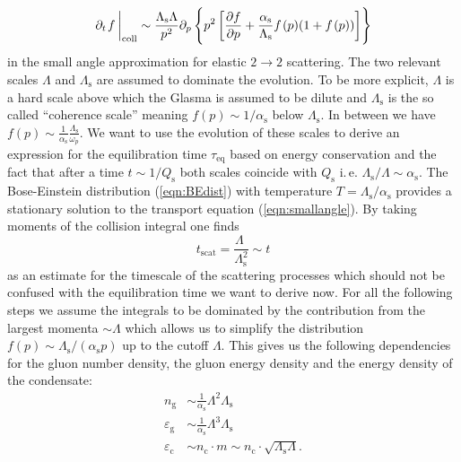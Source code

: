 \begin{equation}
		\eval{\partial_t\hspace{0.1em} f\hspace{0.2em}}_{\mathrm{coll}} \sim \frac{\Lambda_{\mathrm{s}}\Lambda}{p^2}\partial_p\left\{p^2\left[\frac{\partial f}{\partial p} + \frac{\alpha_{\mathrm{s}}}{\Lambda_{\mathrm{s}}}f\hspace{0.1em}(p)(1+f\hspace{0.1em}(p))\right]\right\}\label{eqn:smallangle}
	\end{equation}
in the small angle approximation for elastic $2\rightarrow 2$ scattering. The two relevant scales $\Lambda$ and $\Lambda_{\mathrm{s}}$ are assumed to dominate the evolution. To be more explicit, $\Lambda$ is a hard scale above which the Glasma is assumed to be dilute and $\Lambda_{\mathrm{s}}$ is the so called \enquote{coherence scale} meaning $f(p)\sim 1/\alpha_{\mathrm{s}}$ below $\Lambda_{\mathrm{s}}$. In between we have $f(p)\sim \frac{1}{\alpha_{\mathrm{s}}}\frac{\Lambda_{\mathrm{s}}}{\omega_p}$. We want to use the evolution of these scales to derive an expression for the equilibration time $\tau_{\mathrm{eq}}$ based on energy conservation and the fact that after a time $t\sim 1/Q_{\mathrm{s}}$ both scales coincide with $Q_{\mathrm{s}}$ i.\,e. $\Lambda_{\mathrm{s}}/\Lambda\sim\alpha_{\mathrm{s}}$. The Bose-Einstein distribution (\ref{eqn:BEdist}) with temperature $T = \Lambda_{\mathrm{s}}/\alpha_{\mathrm{s}}$ provides a stationary solution to the transport equation (\ref{eqn:smallangle}). By taking moments of the collision integral one finds 
\begin{equation}
		t_{\mathrm{scat}} = \frac{\Lambda\phantom{.}}{\Lambda_{\mathrm{s}}^2} \sim t
\end{equation}
as an estimate for the timescale of the scattering processes which should not be confused with the equilibration time we want to derive now. For all the following steps we assume the integrals to be dominated by the contribution from the largest momenta $\sim\Lambda$ which allows us to simplify the distribution $f(p)\sim\Lambda_{\mathrm{s}}/(\alpha_{\mathrm{s}}p)$ up to the cutoff $\Lambda$. This gives us the following dependencies for the gluon number density, the gluon energy density and the energy density of the condensate:
\begin{align}
		n_{\mathrm{g}} &\sim \frac{1}{\alpha_{\mathrm{s}}}\Lambda^2\Lambda_{\mathrm{s}} \\
		\varepsilon_{\mathrm{g}} &\sim \frac{1}{\alpha_{\mathrm{s}}}\Lambda^3\Lambda_{\mathrm{s}}\\
		\varepsilon_{\mathrm{c}} &\sim n_{\mathrm{c}}\cdot m \sim n_{\mathrm{c}}\cdot\sqrt{\Lambda_{\mathrm{s}}\Lambda}.
	\end{align}
